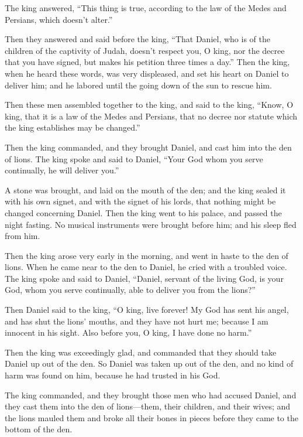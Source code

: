 The king answered, ``This thing is true, according to the law of the
Medes and Persians, which doesn't alter.''

 Then they answered and said before the king, ``That
Daniel, who is of the children of the captivity of Judah, doesn't
respect you, O king, nor the decree that you have signed, but makes his
petition three times a day.''  Then the king, when he heard
these words, was very displeased, and set his heart on Daniel to deliver
him; and he labored until the going down of the sun to rescue him.

 Then these men assembled together to the king, and said to
the king, ``Know, O king, that it is a law of the Medes and Persians,
that no decree nor statute which the king establishes may be changed.''

 Then the king commanded, and they brought Daniel, and cast
him into the den of lions. The king spoke and said to Daniel, ``Your God
whom you serve continually, he will deliver you.''

 A stone was brought, and laid on the mouth of the den; and
the king sealed it with his own signet, and with the signet of his
lords, that nothing might be changed concerning Daniel. 
Then the king went to his palace, and passed the night fasting. No
musical instruments were brought before him; and his sleep fled from
him.

 Then the king arose very early in the morning, and went in
haste to the den of lions.  When he came near to the den to
Daniel, he cried with a troubled voice. The king spoke and said to
Daniel, ``Daniel, servant of the living God, is your God, whom you serve
continually, able to deliver you from the lions?''

 Then Daniel said to the king, ``O king, live forever!
 My God has sent his angel, and has shut the lions' mouths,
and they have not hurt me; because I am innocent in his sight. Also
before you, O king, I have done no harm.''

 Then the king was exceedingly glad, and commanded that
they should take Daniel up out of the den. So Daniel was taken up out of
the den, and no kind of harm was found on him, because he had trusted in
his God.

 The king commanded, and they brought those men who had
accused Daniel, and they cast them into the den of lions---them, their
children, and their wives; and the lions mauled them and broke all their
bones in pieces before they came to the bottom of the den.

